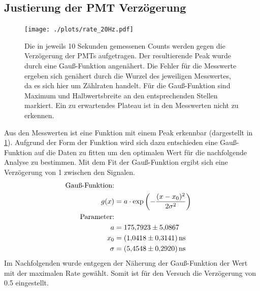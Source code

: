 \subsection{Justierung der PMT Verzögerung}


\begin{figure}[ht]
    \centering
    \texttt{[image: ./plots/rate\_20Hz.pdf]}
    \caption{Die in jeweils \num{10} Sekunden gemessenen Counts werden gegen die Verzögerung der PMTs aufgetragen. Der resultierende Peak wurde durch eine Gauß-Funktion angenähert. Die Fehler für die Messwerte ergeben sich genähert durch die Wurzel des jeweiligen Messwertes, da es sich hier um Zählraten handelt. Für die Gauß-Funktion sind Maximum und Halbwertsbreite an den entsprechenden Stellen markiert. Ein zu erwartendes Plateau ist in den Messwerten nicht zu erkennen.}
    \label{fig:rate_20Hz}
\end{figure}
Aus den Messwerten ist eine Funktion mit einem Peak erkennbar (dargestellt in \ref{fig:rate_20Hz}).
Aufgrund der Form der Funktion wird sich dazu entschieden eine Gauß-Funktion auf die Daten zu fitten um den optimalen Wert für die nachfolgende Analyse zu bestimmen.
Mit dem Fit der Gauß-Funktion ergibt sich eine Verzögerung von \num{1} zwischen den Signalen.
\begin{align*}
    \text{Gauß-Funktion:}\\
    g(x) &= a \cdot \text{exp} \left(-\frac{(x-x_0)^2}{2\sigma^2}\right)\\
    \text{Parameter:}\\
    a &= \num{175.7923 +- 5.0867}\\
    x_0 &= \SI{1.0418 +- 0.3141}{\nano\second}\\
    \sigma &= \SI{5.4548 +- 0.2920}{\nano\second}\\
\end{align*}
Im Nachfolgenden wurde entgegen der Näherung der Gauß-Funktion der Wert mit der maximalen Rate gewählt.
Somit ist für den Versuch die Verzögerung von \num{0.5} eingestellt.
